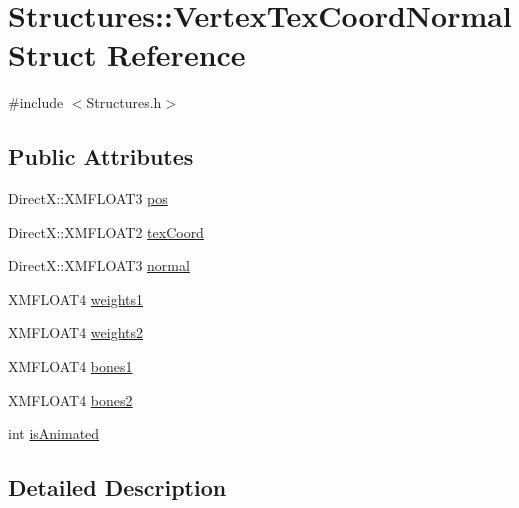 \hypertarget{struct_structures_1_1_vertex_tex_coord_normal}{}\section{Structures\+:\+:Vertex\+Tex\+Coord\+Normal Struct Reference}
\label{struct_structures_1_1_vertex_tex_coord_normal}


{\ttfamily \#include $<$Structures.\+h$>$}

\subsection*{Public Attributes}
\begin{DoxyCompactItemize}
\item 
Direct\+X\+::\+X\+M\+F\+L\+O\+A\+T3 \mbox{\hyperlink{struct_structures_1_1_vertex_tex_coord_normal_ae9f706af7cd80e03ef433eff59f7419e}{pos}}
\item 
Direct\+X\+::\+X\+M\+F\+L\+O\+A\+T2 \mbox{\hyperlink{struct_structures_1_1_vertex_tex_coord_normal_aed98dc1551d7593c1e84ad7fd56f6779}{tex\+Coord}}
\item 
Direct\+X\+::\+X\+M\+F\+L\+O\+A\+T3 \mbox{\hyperlink{struct_structures_1_1_vertex_tex_coord_normal_a055e66f1a6cbcb24d3377168750e6b19}{normal}}
\item 
X\+M\+F\+L\+O\+A\+T4 \mbox{\hyperlink{struct_structures_1_1_vertex_tex_coord_normal_a3ba02c418d9edfebfd52286419e8f3b7}{weights1}}
\item 
X\+M\+F\+L\+O\+A\+T4 \mbox{\hyperlink{struct_structures_1_1_vertex_tex_coord_normal_a26def3fe41a0899cb7df21c7cdad86ee}{weights2}}
\item 
X\+M\+F\+L\+O\+A\+T4 \mbox{\hyperlink{struct_structures_1_1_vertex_tex_coord_normal_a1911339f710a0a672dbf5287c6cdc59d}{bones1}}
\item 
X\+M\+F\+L\+O\+A\+T4 \mbox{\hyperlink{struct_structures_1_1_vertex_tex_coord_normal_abfdb4cfc7b16955ca6a3ab0b1cf8ac2d}{bones2}}
\item 
int \mbox{\hyperlink{struct_structures_1_1_vertex_tex_coord_normal_af001a3ca7038ebabe7f4b8097a8e44be}{is\+Animated}}
\end{DoxyCompactItemize}


\subsection{Detailed Description}


